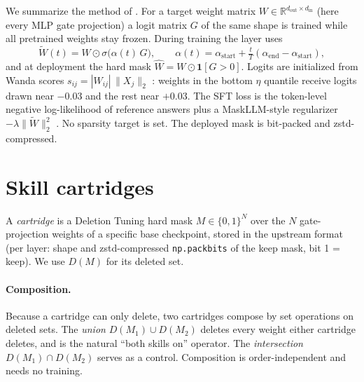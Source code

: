 \documentclass[11pt]{article}
\begin{document}
We summarize the method of \citep{lu2026deleting}. For a target weight matrix $W \in \mathbb{R}^{d_\text{out}\times d_\text{in}}$ (here every MLP gate projection) a logit matrix $G$ of the same shape is trained while all pretrained weights stay frozen. During training the layer uses
\begin{equation}
\widetilde{W}(t) = W \odot \sigma\big(\alpha(t)\,G\big), \qquad \alpha(t) = \alpha_\text{start} + \tfrac{t}{T}(\alpha_\text{end}-\alpha_\text{start}),
\end{equation}
and at deployment the hard mask $\widehat{W} = W \odot \mathbf{1}[G>0]$. Logits are initialized from Wanda scores $s_{ij} = |W_{ij}|\,\lVert X_j \rVert_2$ \citep{sun2023wanda}: weights in the bottom $\eta$ quantile receive logits drawn near $-0.03$ and the rest near $+0.03$. The SFT loss is the token-level negative log-likelihood of reference answers plus a MaskLLM-style regularizer $-\lambda \lVert \widetilde{W} \rVert_2^2$ \citep{fang2024maskllm}. No sparsity target is set. The deployed mask is bit-packed and zstd-compressed.

\section{Skill cartridges}
\label{sec:cartridges}

A \emph{cartridge} is a Deletion Tuning hard mask $M \in \{0,1\}^{N}$ over the $N$ gate-projection weights of a specific base checkpoint, stored in the upstream format (per layer: shape and zstd-compressed \texttt{np.packbits} of the keep mask, bit 1 = keep). We use $D(M)$ for its deleted set.

\paragraph{Composition.} Because a cartridge can only delete, two cartridges compose by set operations on deleted sets. The \emph{union} $D(M_1)\cup D(M_2)$ deletes every weight either cartridge deletes, and is the natural ``both skills on'' operator. The \emph{intersection} $D(M_1)\cap D(M_2)$ serves as a control. Composition is order-independent and needs no training.
\end{document}

